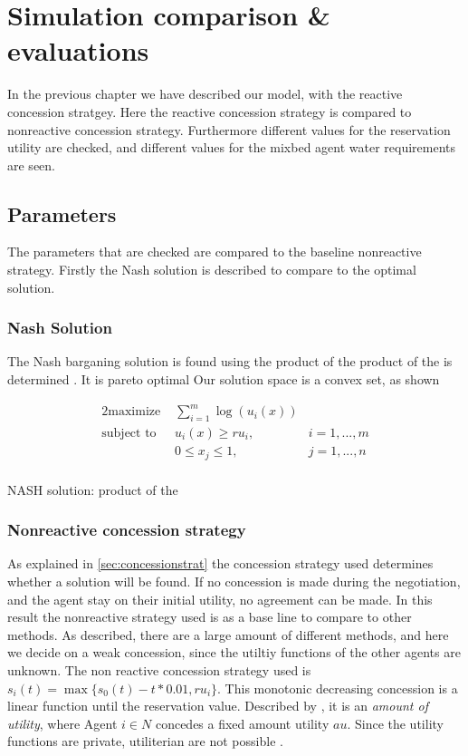\chapter{Simulation comparison \& evaluations}
In the previous chapter we have described our model, with the reactive concession stratgey. Here the reactive concession strategy is compared to nonreactive concession strategy. Furthermore different values for the reservation utility are checked, and different values for the mixbed agent water requirements are seen. 

\section{Parameters}
The parameters that are checked are compared to the baseline nonreactive strategy. Firstly the Nash solution is described to compare to the optimal solution. 

\subsection{Nash Solution}
The Nash barganing solution is found using the product of the product of the is determined . It is pareto optimal 
Our solution space is a convex set, as shown 

\begin{alignat*}{2}
\text{maximize }   	& \sum_{i=1}^m \log (u_i(x))  \\
\text{subject to \ } 	& u_i(x) \geq ru_i, & i = 1,...,m\\
& 0\leq x_j\leq 1, & j = 1,...,n\\
\end{alignat*}


NASH solution:
product of the 

\subsection{Nonreactive concession strategy}
As explained in \cref{sec:concessionstrat} the concession strategy used determines whether a solution will be found. If no concession is made during the negotiation, and the agent stay on their initial utility, no agreement can be made. In this result the nonreactive strategy used is as a base line to compare to other methods. As described, there are a large amount of different methods, and  here we decide on a weak concession, since the utiltiy functions of the other agents are unknown. The non reactive concession strategy used is $s_i(t) = \max \{s_0(t) - t * 0.01, ru_i\}$. This monotonic decreasing concession is a linear function until the reservation value. Described by \cite{wu2009efficient}, it is an \textit{amount of utility}, where Agent $ i \in N$ concedes a fixed amount utility $au$. Since the utility functions are private, utiliterian are not possible \citep{endriss2006monotonic}.

